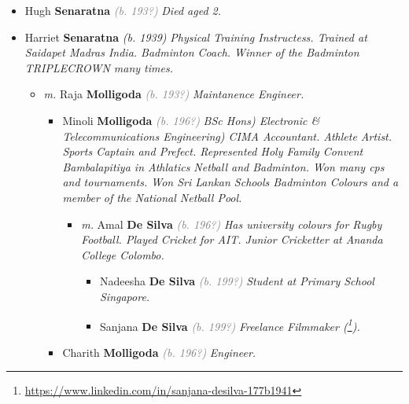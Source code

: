 \documentclass[10pt, openany]{book}
\begin{document}
\begin{itemize}
{\begin{itemize}
{ }
\item{Hugh \textbf{Senaratna} \textcolor{gray}{\textit{(b. 193?)}} \textcolor{slmaroon}{\textit{Died aged 2.}}
 }
\item{Harriet \textbf{Senaratna} \textcolor{slorange}{\textit{(b. 1939)}} \textcolor{slmaroon}{\textit{Physical Training Instructess.
Trained at Saidapet Madras India. Badminton Coach. Winner of the Badminton TRIPLECROWN many times.}}
\begin{itemize}
\item{\textit{m.} Raja \textbf{Molligoda} \textcolor{gray}{\textit{(b. 193?)}} \textcolor{slmaroon}{\textit{Maintanence Engineer.}}   \label{couple:00000542:00000727} \begin{itemize}
\item{Minoli \textbf{Molligoda} \textcolor{gray}{\textit{(b. 196?)}} \textcolor{slmaroon}{\textit{BSc Hons) Electronic \& Telecommunications Engineering) CIMA Accountant.
Athlete Artist. Sports Captain and Prefect. Represented Holy Family Convent Bambalapitiya in Athlatics Netball and Badminton. Won many cps and tournaments. Won Sri Lankan Schools Badminton Colours and a member of the National Netball Pool.}}
\begin{itemize}
\item{\textit{m.} Amal \textbf{De Silva} \textcolor{gray}{\textit{(b. 196?)}} \textcolor{slmaroon}{\textit{Has university colours for Rugby Football. Played Cricket for AIT. Junior Cricketter at Ananda College Colombo.}}   \label{couple:00000141:00000541} \begin{itemize}
\item{Nadeesha \textbf{De Silva} \textcolor{gray}{\textit{(b. 199?)}} \textcolor{slmaroon}{\textit{Student at Primary School Singapore.}}
  }
\item{Sanjana \textbf{De Silva} \textcolor{gray}{\textit{(b. 199?)}} \textcolor{slmaroon}{\textit{Freelance Filmmaker (\footnote{\url{https://www.linkedin.com/in/sanjana-desilva-177b1941}}).}}
  }
\end{itemize}}
\end{itemize}
 }
\item{Charith \textbf{Molligoda} \textcolor{gray}{\textit{(b. 196?)}} \textcolor{slmaroon}{\textit{Engineer.}}
 }
\end{itemize}}
\end{itemize}
}
\end{itemize}}
\end{itemize}
\end{document}
